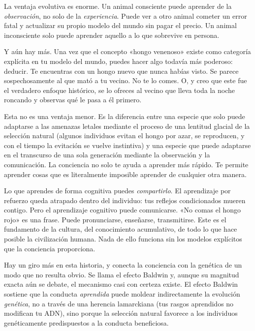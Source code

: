 \documentclass[11pt, twoside, openright]{book}
\begin{document}
La ventaja evolutiva es enorme. Un animal consciente puede aprender de la \textit{observación}, no solo de la \textit{experiencia}. Puede ver a otro animal cometer un error fatal y actualizar su propio modelo del mundo sin pagar el precio. Un animal inconsciente solo puede aprender aquello a lo que sobrevive en persona.

Y aún hay más. Una vez que el concepto «hongo venenoso» existe como categoría explícita en tu modelo del mundo, puedes hacer algo todavía más poderoso: deducir. Te encuentras con un hongo nuevo que nunca habías visto. Se parece sospechosamente al que mató a tu vecino. No te lo comes. O, y creo que este fue el verdadero enfoque histórico, se lo ofreces al vecino que lleva toda la noche roncando y observas qué le pasa a él primero.

Esta no es una ventaja menor. Es la diferencia entre una especie que solo puede adaptarse a las amenazas letales mediante el proceso de una lentitud glacial de la selección natural (algunos individuos evitan el hongo por azar, se reproducen, y con el tiempo la evitación se vuelve instintiva) y una especie que puede adaptarse en el transcurso de una sola generación mediante la observación y la comunicación. La conciencia no solo te ayuda a aprender más rápido. Te permite aprender cosas que es literalmente imposible aprender de cualquier otra manera.

Lo que aprendes de forma cognitiva puedes \textit{compartirlo}. El aprendizaje por refuerzo queda atrapado dentro del individuo: tus reflejos condicionados mueren contigo. Pero el aprendizaje cognitivo puede comunicarse. «No comas el hongo rojo» es una frase. Puede pronunciarse, enseñarse, transmitirse. Este es el fundamento de la cultura, del conocimiento acumulativo, de todo lo que hace posible la civilización humana. Nada de ello funciona sin los modelos explícitos que la conciencia proporciona.

Hay un giro más en esta historia, y conecta la conciencia con la genética de un modo que no resulta obvio. Se llama el efecto Baldwin y, aunque su magnitud exacta aún se debate, el mecanismo casi con certeza existe. El efecto Baldwin sostiene que la conducta \textit{aprendida} puede moldear indirectamente la evolución \textit{genética}, no a través de una herencia lamarckiana (tus rasgos aprendidos no modifican tu ADN), sino porque la selección natural favorece a los individuos genéticamente predispuestos a la conducta beneficiosa.
\end{document}
